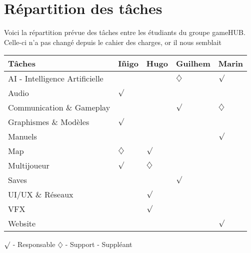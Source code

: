 \section{Répartition des tâches}
\noindent Voici la répartition prévue des tâches entre les étudiants du groupe gameHUB. Celle-ci n'a pas changé depuis le cahier des charges, or il nous semblait 


\begin{center}
\begin{tabular}{|l|l|l|l|l|}
\hline
Tâches                         & Iñigo & Hugo        & Guilhem & Marin \\ \hline
AI - Intelligence Artificielle &       &             & $\diamondsuit$        & $\surd$  \\ \hline
Audio                          & $\surd$  &             &         &       \\ \hline
Communication \& Gameplay                       &       &             & $\surd$    & $\diamondsuit$      \\ \hline
Graphismes \& Modèles          & $\surd$  &             &         &       \\ \hline
Manuels                        &       &             &         & $\surd$  \\ \hline
Map                            & $\diamondsuit$ & $\surd$        &         &       \\ \hline
Multijoueur                    & $\surd$  & $\diamondsuit$ &         &       \\ \hline
Saves                          &       &             & $\surd$    &       \\ \hline
UI/UX \& Réseaux             &       & $\surd$        &         &       \\ \hline
VFX                            &       & $\surd$        &         &       \\ \hline
Website                        &       &  &         & $\surd$  \\ \hline
\end{tabular}
\end{center}

\noindent $\surd$ - Responsable
\newline
$\diamondsuit$ - Support - Suppléant